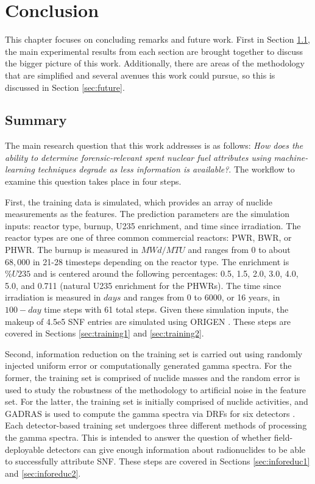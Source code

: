 \chapter{Conclusion}
\label{ch:concl}

This chapter focuses on concluding remarks and future work.  First in Section
\ref{sec:concl}, the main experimental results from each section are brought
together to discuss the bigger picture of this work.  Additionally, there are
areas of the methodology that are simplified and several avenues this work
could pursue, so this is discussed in Section \ref{sec:future}.

\section{Summary}
\label{sec:concl}

The main research question that this work addresses is as follows: \textit{How
does the ability to determine forensic-relevant spent nuclear fuel attributes
using machine-learning techniques degrade as less information is available?}. 
The workflow to examine this question takes place in four steps.  

First, the training data is simulated, which provides an array of nuclide
measurements as the features. The prediction parameters are the simulation
inputs: reactor type, burnup, \gls{U235} enrichment, and time since
irradiation.  The reactor types are one of three common commercial reactors:
\gls{PWR}, \gls{BWR}, or \gls{PHWR}.  The burnup is measured in $MWd/MTU$ and
ranges from 0 to about $68,000$ in 21-28 timesteps depending on the reactor
type.  The enrichment is $\%U235$ and is centered around the following
percentages: 0.5, 1.5, 2.0, 3.0, 4.0, 5.0, and 0.711 (natural \gls{U235}
enrichment for the \gls{PHWR}s).  The time since irradiation is measured in
$days$ and ranges from 0 to 6000, or 16 years, in $100-day$ time steps with 61
total steps. Given these simulation inputs, the makeup of 4.5e5 \gls{SNF}
entries are simulated using \gls{ORIGEN} \cite{scale, origen, origenarp}.
These steps are covered in Sections \ref{sec:training1} and
\ref{sec:training2}.

Second, information reduction on the training set is carried out using randomly
injected uniform error or computationally generated gamma spectra. For the
former, the training set is comprised of nuclide masses and the random error is
used to study the robustness of the methodology to artificial noise in the
feature set.  For the latter, the training set is initially comprised of
nuclide activities, and \gls{GADRAS} is used to compute the gamma spectra via
\gls{DRF}s for six detectors \cite{gadras}. Each detector-based training set
undergoes three different methods of processing the gamma spectra. This is
intended to answer the question of whether field-deployable detectors can give
enough information about radionuclides to be able to successfully attribute
\gls{SNF}.  These steps are covered in Sections \ref{sec:inforeduc1} and
\ref{sec:inforeduc2}.

